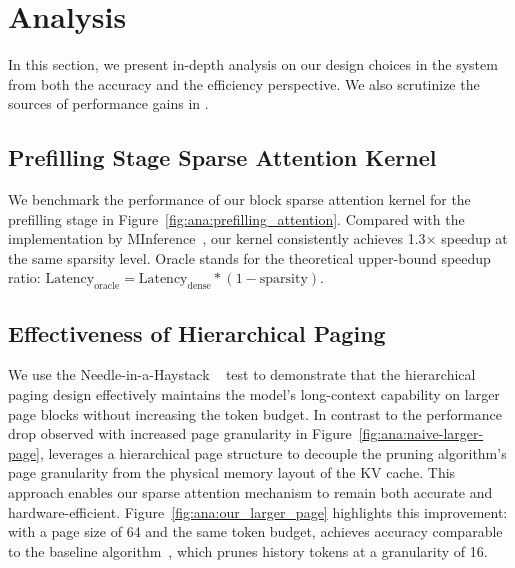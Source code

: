 \section{Analysis}
\label{sect:analysis}





In this section, we present in-depth analysis on our design choices in the \system system from both the accuracy and the efficiency perspective. We also scrutinize the sources of performance gains in .

\subsection{Prefilling Stage Sparse Attention Kernel}

We benchmark the performance of our block sparse attention kernel for the prefilling stage in Figure~\ref{fig:ana:prefilling_attention}. Compared with the implementation by MInference~\cite{jiang2024minference}, our kernel consistently achieves 1.3$\times$ speedup at the same sparsity level. Oracle stands for the theoretical upper-bound speedup ratio: $\text{Latency}_{\text{oracle}} = \text{Latency}_{\text{dense}} * (1-\text{sparsity})$.


\subsection{Effectiveness of Hierarchical Paging}



We use the Needle-in-a-Haystack ~\cite{LLMTest_NeedleInAHaystack} test to demonstrate that the hierarchical paging design effectively maintains the model's long-context capability on larger page blocks without increasing the token budget. In contrast to the performance drop observed with increased page granularity in Figure~\ref{fig:ana:naive-larger-page}, \system leverages a hierarchical page structure to decouple the pruning algorithm’s page granularity from the physical memory layout of the KV cache. This approach enables our sparse attention mechanism to remain both accurate and hardware-efficient. Figure~\ref{fig:ana:our_larger_page} highlights this improvement: with a page size of 64 and the same token budget, \system achieves accuracy comparable to the baseline algorithm~\cite{tang2024quest}, which prunes history tokens at a granularity of 16.

